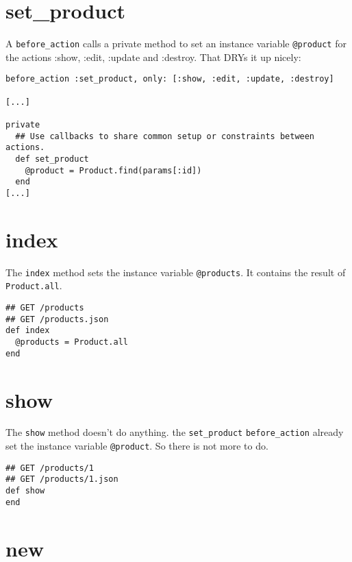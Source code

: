 \documentclass[a4paper]{book}
\begin{document}
\section{set\_product}\label{setux5fproduct}

A \texttt{before\_action} calls a private method to set an instance variable \texttt{@product} for the actions :show, :edit, :update and :destroy. That DRYs it up nicely:

\begin{shaded}\begin{verbatim}
before_action :set_product, only: [:show, :edit, :update, :destroy]

[...]

private
  ## Use callbacks to share common setup or constraints between actions.
  def set_product
    @product = Product.find(params[:id])
  end
[...]
\end{verbatim}\end{shaded}

\section{index}\label{index}

The \texttt{index} method sets the instance variable \texttt{@products}. It contains the result of \texttt{Product.all}.

\begin{shaded}\begin{verbatim}
## GET /products
## GET /products.json
def index
  @products = Product.all
end
\end{verbatim}\end{shaded}

\section{show}\label{show}

The \texttt{show} method doesn't do anything. the \texttt{set\_product} \texttt{before\_action} already set the instance variable \texttt{@product}. So there is not more to do.

\begin{shaded}\begin{verbatim}
## GET /products/1
## GET /products/1.json
def show
end
\end{verbatim}\end{shaded}

\section{new}\label{new-1}
\end{document}
